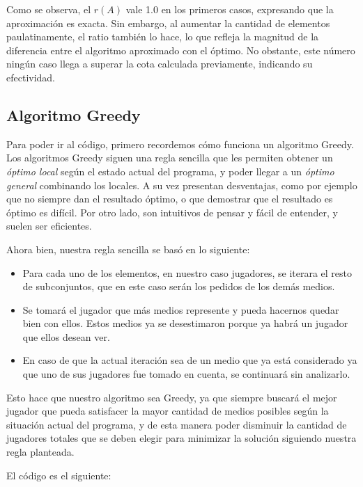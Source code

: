 Como se observa, el $r(A)$ vale 1.0 en los primeros casos, expresando que la aproximación es exacta. Sin embargo, al aumentar la cantidad de elementos paulatinamente, el ratio también lo hace, lo que refleja la magnitud de la diferencia entre el algoritmo aproximado con el óptimo. No obstante, este número ningún caso llega a superar la cota calculada previamente, indicando su efectividad.

\subsection{Algoritmo Greedy}

Para poder ir al código, primero recordemos cómo funciona un algoritmo Greedy. Los algoritmos Greedy siguen una regla sencilla que les permiten obtener un \textit{óptimo local} según el estado actual del programa, y poder llegar a un \textit{óptimo general} combinando los locales. A su vez presentan desventajas, como por ejemplo que no siempre dan el resultado óptimo, o que demostrar que el resultado es óptimo es difícil. Por otro lado, son intuitivos de pensar y fácil de entender, y suelen ser eficientes.

Ahora bien, nuestra regla sencilla se basó en lo siguiente:
\begin{itemize}
    \item Para cada uno de los elementos, en nuestro caso jugadores, se iterara el resto de subconjuntos, que en este caso serán los pedidos de los demás medios.
    \item Se tomará el jugador que más medios represente y pueda hacernos quedar bien con ellos. Estos medios ya se desestimaron porque ya habrá un jugador que ellos desean ver.
    \item En caso de que la actual iteración sea de un medio que ya está considerado ya que uno de sus jugadores fue tomado en cuenta, se continuará sin analizarlo.
\end{itemize}

Esto hace que nuestro algoritmo sea Greedy, ya que siempre buscará el mejor jugador que pueda satisfacer la mayor cantidad de medios posibles según la situación actual del programa, y de esta manera poder disminuir la cantidad de jugadores totales que se deben elegir para minimizar la solución siguiendo nuestra regla planteada.

El código es el siguiente:



